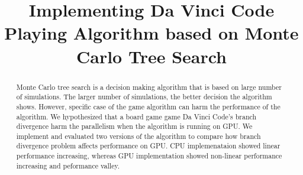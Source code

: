 \documentclass[conference]{IEEEtran}
\begin{document}
\title{Implementing Da Vinci Code Playing Algorithm based on Monte Carlo Tree Search}

\author{
\and
{}
\and
{}
}

\maketitle


\begin{abstract}
Monte Carlo tree search is a decision making algorithm that is based on large number of simulations.
The larger number of simulations, the better decision the algorithm shows.
However, specific case of the game algorithm can harm the performance of the algorithm.
We hypothesized that a board game game Da Vinci Code's branch divergence harm the parallelism when the algorithm is running on GPU.
We implement and evaluated two versions of the algorithm to compare how branch divergence problem affects performance on GPU.
CPU implemenataion showed linear performance increasing, whereas GPU implementation showed non-linear performance increasing and peformance valley.

\end{abstract}




\IEEEpeerreviewmaketitle



% 










\end{document}
